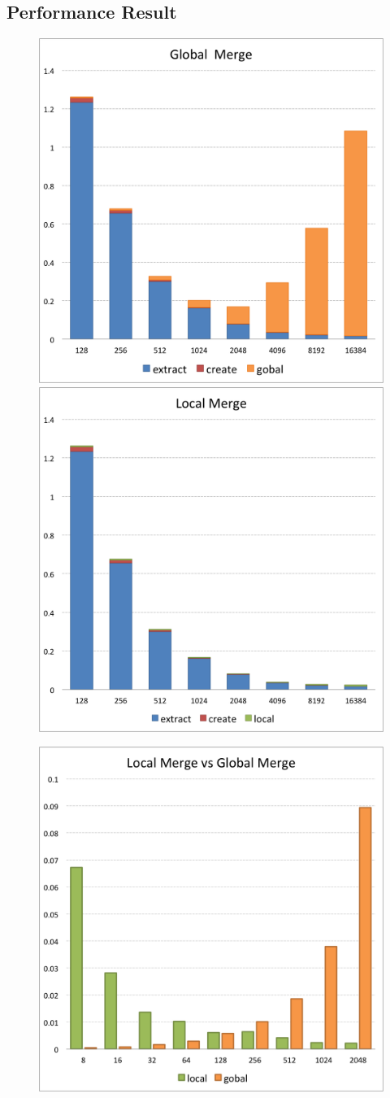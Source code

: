 \documentclass[10pt, conference, compsocconf]{IEEEtran}
\begin{document}
\subsection{Performance Result}
\begin{figure}[!htp]
\includegraphics[width=0.49\linewidth]{figure5.png}
\includegraphics[width=0.49\linewidth]{figure6.png}
\caption{}
\label{fig:improve}
\end{figure}

\begin{figure}[ht]
\centering
\includegraphics[width=0.5\linewidth]{figure7.png}
\caption{}
\label{fig:improve}
\end{figure}
\end{document}
